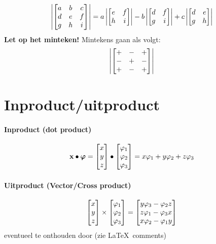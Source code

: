 \documentclass{article}
\begin{document}
    \[
        \det{
        a & b & c \\
        d & e & f \\
        g & h & i \\
        }
        = a \det{e & f \\ h & i} - b \det{d & f \\ g & i} + c \det{d & e \\ g & h}
    \]
    \textbf{Let op het minteken!} Mintekens gaan als volgt:
    \[
        \det{
        + & - & + \\
        - & + & - \\
        + & - & +
        }
    \]
    \section{Inproduct/uitproduct}\label{sec:inproduct/uitproduct}
    \paragraph{Inproduct (dot product)}
    \[ \x \bullet \bm \phi = \matrix{x \\ y \\ z} \bullet \matrix{\phi_1 \\ \phi_2 \\\phi_3} = x \phi_1 + y \phi_2 + z \phi_3 \]
    \paragraph{Uitproduct (Vector/Cross product)}
    \[ \matrix{x \\ y \\ z} \times \matrix{\phi_1 \\ \phi_2 \\\phi_3} = \matrix{y \phi_3 - \phi_2 z \\ z \phi_1 - \phi_3 x \\ x \phi_2 - \phi_1 y}  \]
    eventueel te onthouden door (zie \LaTeX\ comments)

\end{document}
